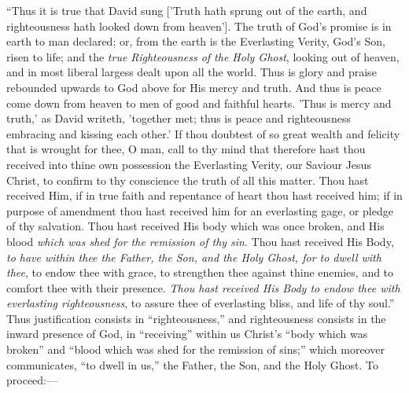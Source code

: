 ``Thus it is true that David sung ['Truth hath sprung out of
the earth, and righteousness hath looked down from heaven']. The truth
of God's promise is in earth to man declared; or, from the earth is
the Everlasting Verity, God's Son, risen to life; and the \emph{true
Righteousness of the Holy Ghost}, looking out of heaven, and in
most liberal largess dealt upon all the world. Thus is glory and
praise rebounded upwards to God above for His mercy and truth. And
thus is peace come down from heaven to men of good and faithful
hearts. 'Thus is mercy and truth,' as David writeth, 'together met;
thus is peace and righteousness embracing and kissing each other.' If
thou doubtest of so great wealth and felicity that is wrought for
thee, O man, call to thy mind that therefore hast thou received into
thine own possession the Everlasting Verity, our Saviour Jesus Christ,
to confirm to thy conscience the truth of all this matter. Thou hast
received Him, if in true faith and repentance of heart thou hast
received him; if in purpose of amendment thou hast received him for an
everlasting gage, or pledge of thy salvation. Thou hast received His
body which was once broken, and His blood \emph{which was shed for the
remission of thy sin}. Thou hast received His Body, \emph{to have
within thee the Father, the Son, and the Holy Ghost, for to dwell with
thee}, to endow thee with grace, to strengthen thee against thine
enemies, and to comfort thee with their presence. \emph{Thou hast
received His Body to endow thee with everlasting righteousness}, to
assure thee of everlasting bliss, and life of thy soul.'' Thus justification consists in ``righteousness,'' and
righteousness consists in the inward presence of God, in
``receiving'' within us Christ's ``body which was
broken'' and ``blood which was shed for the remission of
sins;'' which moreover communicates, ``to dwell in us,''
the Father, the Son, and the Holy Ghost. To proceed:—

